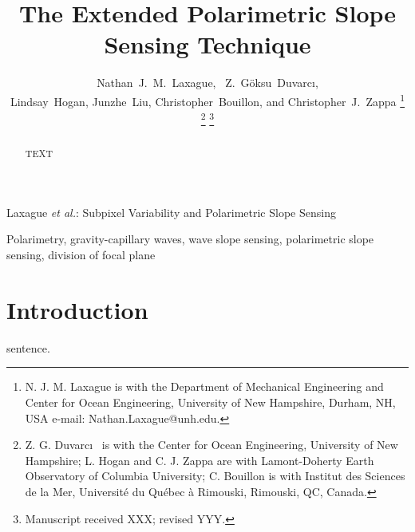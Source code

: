 \documentclass[letterpaper,journal]{IEEEtran}
\begin{document}
%
\title{The Extended Polarimetric Slope Sensing Technique}

\author{Nathan~J.~M.~Laxague,~
        Z.~G\"oksu~Duvarc\i,\\
        Lindsay~Hogan, Junzhe~Liu,
        Christopher~Bouillon, and Christopher~J.~Zappa%
\thanks{N. J. M. Laxague is with the Department
of Mechanical Engineering and Center for Ocean Engineering, University of New Hampshire, Durham, NH, USA e-mail: Nathan.Laxague@unh.edu.}%
\thanks{Z. G. Duvarc\i~ is with the Center for Ocean Engineering, University of New Hampshire; L. Hogan and C. J. Zappa are with Lamont-Doherty Earth Observatory of Columbia University; C. Bouillon is with Institut des Sciences de la Mer, Université du Québec à Rimouski, Rimouski, QC, Canada.}%
\thanks{Manuscript received XXX; revised YYY.}}

%
{Laxague \MakeLowercase{\textit{et al.}}: Subpixel Variability and Polarimetric Slope Sensing}

\maketitle

\begin{abstract}
TEXT

\end{abstract}

\begin{IEEEkeywords}
Polarimetry, gravity-capillary waves, wave slope sensing, polarimetric slope sensing, division of focal plane
\end{IEEEkeywords}

\IEEEpeerreviewmaketitle

\vspace{-15pt}

\section{Introduction}
\label{sec:intro}
 sentence.
\end{document}
